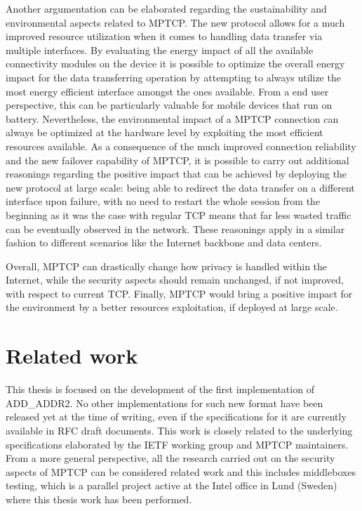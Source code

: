 Another argumentation can be elaborated regarding the sustainability and environmental aspects related to MPTCP. The new protocol allows for a much improved resource utilization when it comes to handling data transfer via multiple interfaces. By evaluating the energy impact of all the available connectivity modules on the device it is possible to optimize the overall energy impact for the data transferring operation by attempting to always utilize the most energy efficient interface amongst the ones available. From a end user perspective, this can be particularly valuable for mobile devices that run on battery. Nevertheless, the environmental impact of a MPTCP connection can always be optimized at the hardware level by exploiting the most efficient resources available.
As a consequence of the much improved connection reliability and the new failover capability of MPTCP, it is possible to carry out additional reasonings regarding the positive impact that can be achieved by deploying the new protocol at large scale: being able to redirect the data transfer on a different interface upon failure, with no need to restart the whole session from the beginning as it was the case with regular TCP means that far less wasted traffic can be eventually observed in the network. These reasonings apply in a similar fashion to different scenarios like the Internet backbone and data centers.

Overall, MPTCP can drastically change how privacy is handled within the Internet, while the security aspects should remain unchanged, if not improved, with respect to current TCP. Finally, MPTCP would bring a positive impact for the environment by a better resources exploitation, if deployed at large scale.

\section{Related work}
This thesis is focused on the development of the first implementation of ADD\_ADDR2. No other implementations for such new format have been released yet at the time of writing, even if the specifications for it are currently available in RFC draft documents. This work is closely related to the underlying specifications elaborated by the IETF working group and MPTCP maintainers. From a more general perspective, all the research carried out on the security aspects of MPTCP can be considered related work and this includes middleboxes testing, which is a parallel project active at the Intel office in Lund (Sweden) where this thesis work has been performed. 

